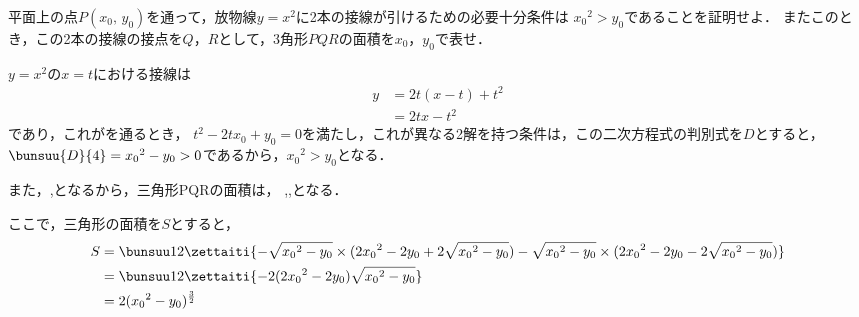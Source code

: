\begin{problem}
平面上の点$P(x_0, \, y_0)$を通って，放物線$y=x^2$に2本の接線が引けるための必要十分条件は
${x_0}^2>y_0$であることを証明せよ．
またこのとき，この2本の接線の接点を$Q$，$R$として，3角形$PQR$の面積を$x_0$，$y_0$で表せ．
\end{problem}



$y = x^2$の$x=t$における接線は
\begin{align*}
  y &= 2t(x-t) + t^2 \\
  &= 2tx - t^2
\end{align*}
であり，これがを通るとき，
$t^2 - 2tx_0 + y_0 = 0$を満たし，これが異なる2解を持つ条件は，この二次方程式の判別式を$D$とすると，
$\bunsuu{D}{4} = {x_0}^2 - y_0 >0$であるから，${x_0}^2 > y_0$となる．

また，,となるから，三角形PQRの面積は，
,,となる．

ここで，三角形の面積を$S$とすると，
\begin{align*}
  S &= \bunsuu12 \zettaiti{-\sqrt{{x_0}^2-y_0}\times (2{x_0}^2-2y_0+2\sqrt{{x_0}^2-y_0}) - \sqrt{{x_0}^2-y_0} \times
  (2{x_0}^2-2y_0-2\sqrt{{x_0}^2-y_0})} \\
  &= \bunsuu12 \zettaiti{-2(2{x_0}^2-2y_0) \sqrt{{x_0}^2-y_0}} \\
  &= 2 ({x_0}^2 - y_0)^{\frac32}
\end{align*}

